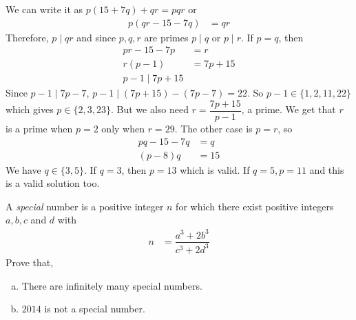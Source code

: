 \documentclass[problems.tex]{subfile}
\begin{document}
	\begin{solution}
		We can write it as $p(15+7q)+qr=pqr$ or
			\begin{align*}
				p(qr-15-7q) & = qr
			\end{align*}
		Therefore, $p\mid qr$ and since $p,q,r$ are primes $p\mid q$ or $p\mid r$. If $p=q$, then
			\begin{align*}
				pr-15-7p & = r\\
				r(p-1) & = 7p+15\\
				p-1\mid 7p+15
			\end{align*}
		Since $p-1\mid 7p-7$, $p-1\mid (7p+15)-(7p-7)=22$. So $p-1\in\{1,2,11,22\}$ which gives $p\in\{2,3,23\}$. But we also need $r=\dfrac{7p+15}{p-1}$, a prime. We get that $r$ is a prime when $p=2$ only when $r=29$. The other case is $p=r$, so
			\begin{align*}
				pq-15-7q & = q\\
				(p-8)q & = 15
			\end{align*}
		We have $q\in\{3,5\}$. If $q=3$, then $p=13$ which is valid. If $q=5,p=11$ and this is a valid solution too.
	\end{solution}

	\begin{problem}[Serbia $2014$]
		A \textit{special} number is a positive integer $n$ for which there exist positive integers $a, b, c$ and $d$ with
			\begin{align*}
				n & = \dfrac{a^3+2b^3}{c^3+2d^3}
			\end{align*}
		Prove that,
			\begin{enumerate}[a.]
				\item There are infinitely many special numbers.
				\item $2014$ is not a special number.
			\end{enumerate}
	\end{problem}
\end{document}
